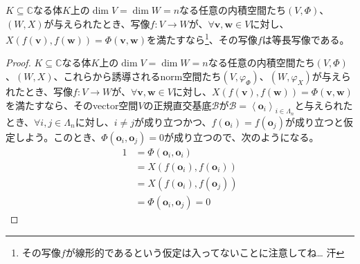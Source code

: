 \documentclass[dvipdfmx]{jsarticle}
\begin{document}
\begin{thm}\label{2.3.7.8}
$K \subseteq \mathbb{C}$なる体$K$上の$\dim V = \dim W = n$なる任意の内積空間たち$(V,\varPhi )$、$(W,X)$が与えられたとき、写像$f:V \rightarrow W$が、$\forall\mathbf{v},\mathbf{w} \in V$に対し、$X\left( f\left( \mathbf{v} \right),f\left( \mathbf{w} \right) \right) = \varPhi \left( \mathbf{v},\mathbf{w} \right)$を満たすなら\footnote{その写像$f$が線形的であるという仮定は入ってないことに注意してね… 汗}、その写像$f$は等長写像である。
\end{thm}
\begin{proof}
$K \subseteq \mathbb{C}$なる体$K$上の$\dim V = \dim W = n$なる任意の内積空間たち$(V,\varPhi )$、$(W,X)$、これらから誘導されるnorm空間たち$\left( V,\varphi_{\varPhi } \right)$、$\left( W,\varphi_{X} \right)$が与えられたとき、写像$f:V \rightarrow W$が、$\forall\mathbf{v},\mathbf{w} \in V$に対し、$X\left( f\left( \mathbf{v} \right),f\left( \mathbf{w} \right) \right) = \varPhi \left( \mathbf{v},\mathbf{w} \right)$を満たすなら、そのvector空間$V$の正規直交基底$\mathcal{B}$が$\mathcal{B} =\left\langle \mathbf{o}_{i} \right\rangle_{i \in \varLambda_{n}}$と与えられたとき、$\forall i,j \in \varLambda_{n}$に対し、$i \neq j$が成り立つかつ、$f\left( \mathbf{o}_{i} \right) = f\left( \mathbf{o}_{j} \right)$が成り立つと仮定しよう。このとき、$\varPhi \left( \mathbf{o}_{i},\mathbf{o}_{j} \right) = 0$が成り立つので、次のようになる。
\begin{align*}
1 &= \varPhi \left( \mathbf{o}_{i},\mathbf{o}_{i} \right)\\
&= X\left( f\left( \mathbf{o}_{i} \right),f\left( \mathbf{o}_{i} \right) \right)\\
&= X\left( f\left( \mathbf{o}_{i} \right),f\left( \mathbf{o}_{j} \right) \right)\\
&= \varPhi \left( \mathbf{o}_{i},\mathbf{o}_{j} \right) = 0
\end{align*}

\end{proof}
\end{document}
